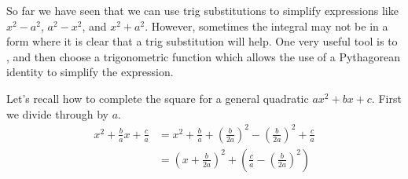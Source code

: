 \documentclass{ximera}
\begin{document}
% 
%
%
%
%
%
%
%

So far we have seen that we can use trig substitutions to simplify expressions
like $x^{2}-a^{2}$, $a^{2}-x^{2}$, and $x^{2}+a^{2}$. 
However, sometimes the integral may not be in a form where it is clear that a trig substitution 
will help. 
One very useful tool is to , and then choose a
trigonometric function which allows the use of a Pythagorean identity
to simplify the expression. 

Let's recall how to complete the square for a general quadratic $ax^2+bx+c$.  First we divide through by $a$.
\begin{align*}
x^{2}+\frac{b}{a}x+\frac{c}{a} &=x^{2}+\frac{b}{a}+\left(\frac{b}{2a}\right)^{2}-\left(\frac{b}{2a}\right)^{2}+\frac{c}{a} \\
&=\left(x+\frac{b}{2a}\right)^{2}+\left(\frac{c}{a}-\left(\frac{b}{2a}\right)^{2}\right)
\end{align*}
\end{document}
